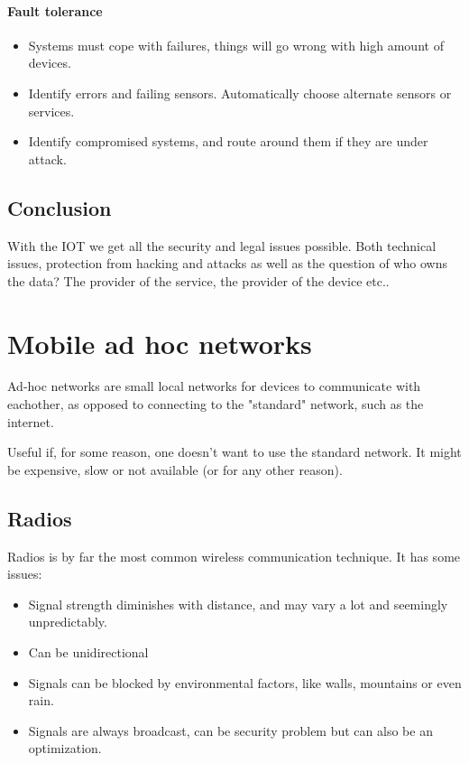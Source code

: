 	\subsubsection{Fault tolerance}
	\begin{itemize}
		\item Systems must cope with failures, things will go wrong with high amount of devices.
		\item Identify errors and failing sensors. Automatically choose alternate sensors or services.
		\item Identify compromised systems, and route around them if they are under attack.
	\end{itemize}
	
	\section{Conclusion}
	With the \gls{IOT} we get all the security and legal issues possible. Both technical issues, protection from hacking and attacks as well as the question of who owns the data? The provider of the service, the provider of the device etc..
	
	\chapter{Mobile ad hoc networks}
	Ad-hoc networks are small local networks for devices to communicate with eachother, as opposed to connecting to the "standard" network, such as the internet.
	
	Useful if, for some reason, one doesn't want to use the standard network. It might be expensive, slow or not available (or for any other reason).
	
	\section{Radios}
	Radios is by far the most common wireless communication technique. It has some issues:
	\begin{itemize}
		\item Signal strength diminishes with distance, and may vary a lot and seemingly unpredictably.
		\item Can be unidirectional
		\item Signals can be blocked by environmental factors, like walls, mountains or even rain.
		\item Signals are always broadcast, can be security problem but can also be an optimization.
	\end{itemize}
	
